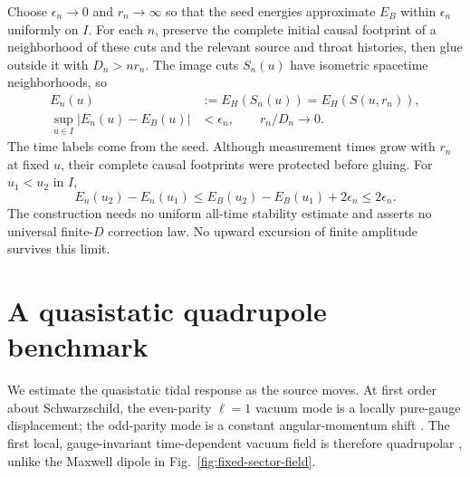 \documentclass[aps,prd,10pt,onecolumn,nofootinbib,superscriptaddress,floatfix]{revtex4-2}
\begin{document}
Choose $\epsilon_n\to0$ and $r_n\to\infty$ so that the seed energies
approximate $E_B$ within $\epsilon_n$ uniformly on $I$.
For each $n$, preserve the complete initial causal footprint of a
neighborhood of these cuts and the relevant source and throat histories,
then glue outside it with $D_n>nr_n$.  The image cuts $S_n(u)$ have
isometric spacetime neighborhoods, so
\begin{equation}
 \begin{split}
 E_n(u)&:=E_H(S_n(u))=E_H(S(u,r_n)),\\
 \sup_{u\in I}|E_n(u)-E_B(u)|&<\epsilon_n,
 \qquad r_n/D_n\longrightarrow0.
 \end{split}
 \label{eq:handle-energy-limit}
\end{equation}
The time labels come from the seed.  Although measurement times grow
with $r_n$ at fixed $u$, their complete causal footprints were protected
before gluing.  For $u_1<u_2$ in $I$,
\begin{equation}
 E_n(u_2)-E_n(u_1)
 \le E_B(u_2)-E_B(u_1)+2\epsilon_n
 \le2\epsilon_n.
 \label{eq:handle-no-rise}
\end{equation}
The construction needs no uniform all-time stability estimate and
asserts no universal finite-$D$ correction law.
No upward excursion of finite amplitude survives this limit.

\newpage
\section{A quasistatic quadrupole benchmark}
\label{app:quadrupole}

We estimate the quasistatic tidal response as the source moves.  At first
order about Schwarzschild, the even-parity $\ell=1$ vacuum mode is a
locally pure-gauge displacement; the odd-parity mode is a constant
angular-momentum shift \cite{MartelPoisson2005SchwarzschildPerturbations}.
The first local, gauge-invariant time-dependent vacuum field is therefore
quadrupolar \cite{Thorne1980Multipole}, unlike the Maxwell dipole in
Fig.~\ref{fig:fixed-sector-field}.
\end{document}
